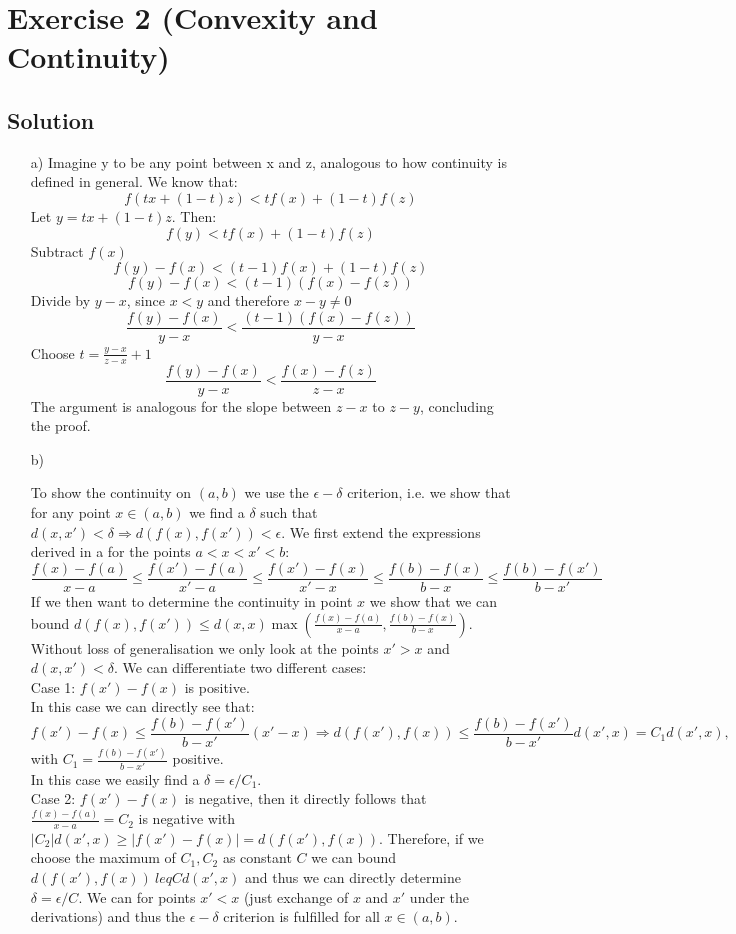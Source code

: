\documentclass[10pt]{article}
\numberwithin{equation}{section}
\begin{document}
\section*{Exercise 2 (Convexity and Continuity)}

\subsection*{Solution}
\begin{enumerate}
\item[a)]{
    Imagine y to be any point between x and z, analogous to how continuity is defined in general.
    We know that:
    $$f(tx + (1-t)z) < tf(x) + (1-t)f(z)$$
    Let $y = tx + (1-t)z$. Then:
    $$ f(y) < tf(x) + (1-t)f(z)$$ 
    Subtract $f(x)$
    $$ f(y) - f(x) < (t-1)f(x) + (1-t)f(z)$$
    $$ f(y) - f(x) < (t-1)(f(x) - f(z))$$
    Divide by $y-x$, since $x < y$ and therefore $x-y \neq 0$
    $$ \frac{f(y) - f(x)}{y-x} < \frac{(t-1)(f(x) - f(z))}{y-x}$$
    Choose $t = \frac{y-x}{z-x} +1$
    $$ \frac{f(y) - f(x)}{y-x} < \frac{f(x) - f(z)}{z-x}$$
    The argument is analogous for the slope between $z-x$ to $z-y$, concluding the proof.
}
\item[b)]{	To show the continuity on $(a, b)$ we use the $\epsilon-\delta$ criterion, i.e. we show that for any point $x\in(a, b)$ we find a $\delta$ such that $d(x, x') < \delta \Rightarrow d(f(x), f(x')) < \epsilon$.
	We first extend the expressions derived in a for the points $a<x<x'<b$:
	$$
	\frac{f(x)-f(a)}{x-a}\leq\frac{f(x')-f(a)}{x'-a}\leq\frac{f(x')-f(x)}{x'-x}\leq \frac{f(b)-f(x)}{b-x}\leq\frac{f(b)-f(x')}{b-x'}
	$$
	If we then want to determine the continuity in point $x$ we show that we can bound $d(f(x),f(x')) \leq d(x, x) \max(\frac{f(x)-f(a)}{x-a}, \frac{f(b)-f(x)}{b-x})$. 
	Without loss of generalisation we only look at the points $x'>x$ and $d(x, x') < \delta$. 
	We can differentiate two different cases:\\
	Case 1: $f(x')-f(x)$ is positive.\\
	In this case we can directly see that: 
	$$f(x')-f(x) \leq \frac{f(b)-f(x')}{b-x'} (x'-x) \Rightarrow d(f(x'), f(x)) \leq \frac{f(b)-f(x')}{b-x'}d(x', x) = C_1 d(x',x),
	$$ with $C_1 = \frac{f(b)-f(x')}{b-x'}$ positive. \\
	In this case we easily find a $\delta = \epsilon /C_1$. \\
	Case 2: $f(x')-f(x)$ is negative, then it directly follows that $	\frac{f(x)-f(a)}{x-a} = C_2$ is negative with $|C_2| d(x', x) \geq | f(x')-f(x)| = d(f(x'), f(x))$. 
	Therefore, if we choose the maximum of $C_1, C_2$ as constant $C$ we can bound $d(f(x'), f(x)) \ leq C d(x', x)$ and thus we can directly determine $\delta = \epsilon / C$. 
	We can for points $x'<x$ (just exchange of $x$ and $x'$ under the derivations) and thus the $\epsilon-\delta$ criterion is fulfilled for all $x \in (a, b)$.

}
\end{enumerate}
\end{document}
